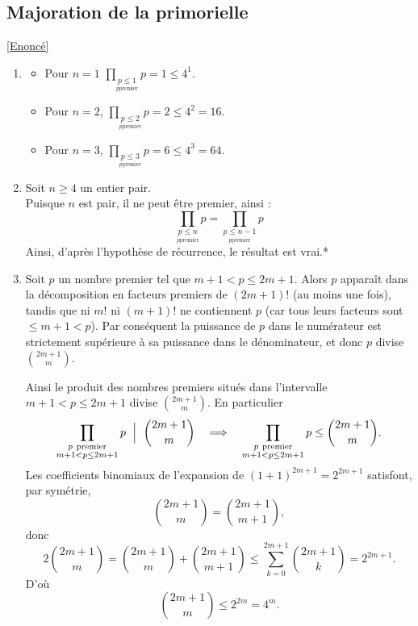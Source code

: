 \documentclass[8pt]{book}
\begin{document}
	\subsection{Majoration de la primorielle}
	\label{Majoration de la primorielle corrigé}
	\textcolor{blue}{\hyperref[Majoration de la primorielle]{[Enoncé]}}\\
	\begin{enumerate}[leftmargin=*]
		\item \begin{itemize}
			\item Pour $n=1$ $\displaystyle\prod_{\underset{p \text{premier}}{p\leq 1}}p=1\leq 4^1$.
			\item Pour $n=2$, $\displaystyle\prod_{\underset{p \text{premier}}{p\leq 2}}p=2\leq 4^2=16$.
			\item Pour $n=3$, $\displaystyle\prod_{\underset{p \text{premier}}{p\leq 3}}p=6\leq 4^3=64$.
		\end{itemize}
		\item Soit $n\geq 4$ un entier pair.\\
		Puisque $n$ est pair, il ne peut être premier, ainsi : 
		\[\prod_{\underset{p \text{premier}}{p\leq n}}p=\prod_{\underset{p \text{premier}}{p\leq n-1}}p\]
		Ainsi, d'après l'hypothèse de récurrence, le résultat est vrai.*
		\item Soit \(p\) un nombre premier tel que \(m+1<p\le 2m+1\). Alors \(p\) apparaît dans la décomposition en facteurs premiers de \((2m+1)!\) (au moins une fois), tandis que ni \(m!\) ni \((m+1)!\) ne contiennent \(p\) (car tous leurs facteurs sont \(\le m+1<p\)). Par conséquent la puissance de \(p\) dans le numérateur est strictement supérieure à sa puissance dans le dénominateur, et donc \(p\) divise
		\(\binom{2m+1}{m}\).
		
		Ainsi le produit des nombres premiers situés dans l'intervalle \(m+1<p\le 2m+1\) divise \(\binom{2m+1}{m}\). En particulier
		\[
		\prod_{\substack{p\ \text{premier}\\ m+1<p\le 2m+1}} p \ \Bigm|\ \binom{2m+1}{m}
		\quad\Longrightarrow\quad
		\prod_{\substack{p\ \text{premier}\\ m+1<p\le 2m+1}} p \le \binom{2m+1}{m}.
		\]
		Les coefficients binomiaux de l'expansion de \((1+1)^{2m+1}=2^{2m+1}\) satisfont, par symétrie,
		\[
		\binom{2m+1}{m}=\binom{2m+1}{m+1},
		\]
		donc
		\[
		2\binom{2m+1}{m}=\binom{2m+1}{m}+\binom{2m+1}{m+1}\le\sum_{k=0}^{2m+1}\binom{2m+1}{k}=2^{2m+1}.
		\]
		D'où
		\[
		\binom{2m+1}{m}\le 2^{2m}=4^{m}.
		\]
		

\end{enumerate}
\end{document}
